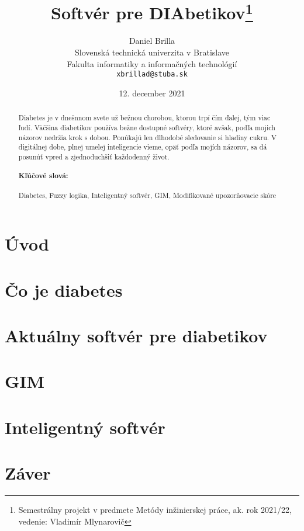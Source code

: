 \documentclass[10pt,slovak,a4paper]{article}
\title{Softvér pre DIAbetikov\thanks{Semestrálny projekt v predmete Metódy inžinierskej práce, ak. rok 2021/22, vedenie: Vladimír Mlynarovič}}
\author{Daniel Brilla\\[2pt]
	{\small Slovenská technická univerzita v Bratislave}\\
	{\small Fakulta informatiky a informačných technológií}\\
	{\small \texttt{xbrillad@stuba.sk}}
	}
\date{\small 12. december 2021}
\begin{document}
\maketitle

\begin{abstract}
Diabetes je v dnešnnom svete už bežnou chorobou, ktorou trpí čím ďalej, tým viac ľudí. Väčšina diabetikov používa bežne dostupné softvéry, ktoré avšak, podľa mojich názorov nedržia krok s dobou. Ponúkajú len dlhodobé sledovanie si hladiny cukru. V digitálnej dobe, plnej umelej inteligencie vieme, opäť podľa mojích názorov, sa dá posunúť vpred a zjednoduchšiť každodenný život. 

\paragraph{Kľúčové slová:} Diabetes, Fuzzy logika, Inteligentný softvér, GIM, Modifikované upozorňovacie skóre 
\end{abstract}



\section{Úvod}



\section{Čo je diabetes} \label{diabetes}



\section{Aktuálny softvér pre diabetikov}




\section{GIM} \label{GIM}



\section{Inteligentný softvér} \label{int-soft}




\section{Záver} \label{zaver}





\newpage
	
\end{document}
